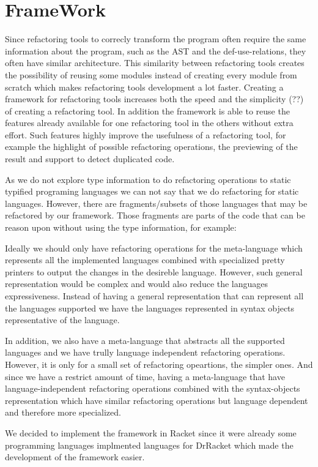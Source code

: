\section{FrameWork}
Since refactoring tools to correcly transform the program often require the same information about the program, such as
the AST and the def-use-relations, they often have similar architecture.
This similarity between refactoring tools creates the possibility of reusing some modules
instead of creating every module from scratch which makes refactoring tools
development a lot faster.
Creating a framework for refactoring tools increases both the speed and the simplicity (??)
of creating a refactoring tool. In addition the framework is able to reuse the features already available
for one refactoring tool in the others without extra effort. Such features highly improve
the usefulness of a refactoring tool, for example the highlight of possible refactoring
operations, the previewing of the result and support to detect duplicated code.

As we do not explore type information to do refactoring operations to static typified
programing languages we can not say that we do refactoring for static languages.
However, there are fragments/subsets of those languages that may be refactored by our
framework. Those fragments are parts of the code that can be reason upon without using
the type information, for example:

Ideally we should only have refactoring operations for the meta-language which represents
all the implemented languages combined with specialized pretty printers to output the changes in the
desireble language.
However, such general representation would be complex and would also reduce the languages
expressiveness.
Instead of having a general representation that can represent all the languages
supported we have the languages represented in syntax objects representative of the language.

In addition, we also have a meta-language that abstracts all the supported languages and
we have trully language independent refactoring operations. However, it is only
for a small set of refactoring opeartions, the simpler ones.
And since we have a restrict amount of time, having
a meta-language that have language-independent refactoring operations combined
with the syntax-objects representation which have similar refactoring operations but
language dependent and therefore more specialized.

We decided to implement the framework in Racket since it were already some programming
languages implmented languages for DrRacket which made the development of the framework easier.

